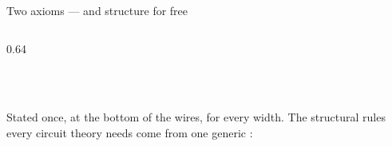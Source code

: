 \begin{frame}{Two axioms --- and structure for free}
\begin{columns}[c]
\begin{column}{0.64\textwidth}
\begin{code}%
\>[0]\AgdaSpace{}%
\AgdaSpace{}%
\AgdaSymbol{:}\AgdaSpace{}%
\AgdaSymbol{(}\AgdaSpace{}%
\AgdaSymbol{:}\AgdaSpace{}%
\AgdaSymbol{)}\AgdaSpace{}%
\AgdaSpace{}%
\AgdaSpace{}%
\AgdaSymbol{(}\AgdaSpace{}%
\AgdaSymbol{)}\AgdaSpace{}%
\<%
\\
\>[0][@{}l@{\AgdaIndent{0}}]%
\>[2]%
\>[14]\AgdaSymbol{:}\AgdaSpace{}%
\AgdaSymbol{(}\AgdaSpace{}%
\AgdaSymbol{)}\AgdaSpace{}%
\AgdaSpace{}%
\AgdaSpace{}%
\AgdaSpace{}%
\AgdaSpace{}%
\AgdaOperator{\AgdaDatatype{===}}\AgdaSpace{}%
\<%
\\
%
\>[2]\AgdaSpace{}%
\AgdaSymbol{:}\AgdaSpace{}%
\AgdaSymbol{(}\AgdaSpace{}%
\AgdaSymbol{)}\AgdaSpace{}%
\AgdaSpace{}%
\AgdaSpace{}%
\AgdaSpace{}%
\AgdaSpace{}%
\AgdaSpace{}%
\AgdaSpace{}%
\AgdaSpace{}%
\AgdaOperator{\AgdaDatatype{===}}\AgdaSpace{}%
\AgdaSpace{}%
\AgdaSpace{}%
\AgdaSpace{}%
\AgdaSpace{}%
\AgdaSpace{}%
\AgdaSpace{}%
\<%
\end{code}
\vspace{2pt}
{\small Stated once, at the bottom of the wires, for every width. The structural
rules every circuit theory needs come from one generic :}
\renewcommand{\AgdaCodeStyle}{\scriptsize}
\begin{code}%
\>[0]\AgdaSpace{}%
\AgdaSpace{}%
\AgdaSymbol{:}\AgdaSpace{}%

\end{code}
\end{column}
\end{columns}
\end{frame}
